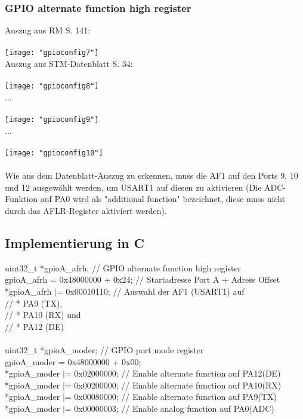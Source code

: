 \documentclass[11pt]{report}
\begin{document}
			\subsubsection{GPIO alternate function high register}
				Auszug aus RM S. 141:\\
				\\\texttt{[image: "gpioconfig7"]}\\
				Auszug aus STM-Datenblatt S. 34:\\
				\\\texttt{[image: "gpioconfig8"]}\\
				...\\
				\\\texttt{[image: "gpioconfig9"]}\\
				...\\
				\\\texttt{[image: "gpioconfig10"]}\\
				\\Wie aus dem Datenblatt-Auszug zu erkennen, muss die AF1 auf den Ports 9, 10 und 12 ausgewählt werden, um USART1 auf diesen zu aktivieren (Die ADC-Funktion auf PA0 wird als "additional function" bezeichnet, diese muss nicht durch das AFLR-Register aktiviert werden).
		\subsection{Implementierung in C}
				uint32\_t *gpioA\_afrh; // GPIO alternate function high register\\
	gpioA\_afrh = 0x48000000 + 0x24; // Startadresse Port A + Adress Offset\\
	*gpioA\_afrh $|$= 0x00010110; // Auswahl der AF1 (USART1) auf\\ 
	// * PA9 (TX),\\
	// * PA10 (RX) und\\
	// * PA12 (DE)\\
	\\uint32\_t *gpioA\_moder; // GPIO port mode register\\
	gpioA\_moder = 0x48000000 + 0x00;\\
	*gpioA\_moder $|$= 0x02000000; // Enable alternate function auf PA12(DE)\\
	*gpioA\_moder $|$= 0x00200000; // Enable alternate function auf PA10(RX)\\
	*gpioA\_moder $|$= 0x00080000; // Enable alternate function auf PA9(TX)\\
	*gpioA\_moder $|$= 0x00000003; // Enable analog function auf PA0(ADC)
\end{document}
